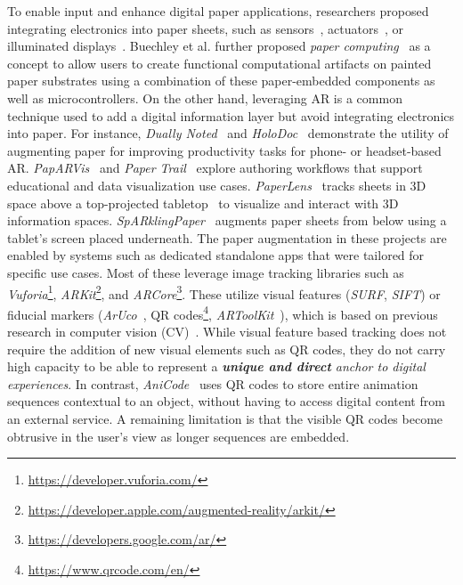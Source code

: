 To enable input and enhance digital paper applications, researchers proposed integrating electronics into paper sheets, such as sensors~\cite{gong_printsense_2014, jacoby_drawing_2013}, actuators~\cite{qi_electronic_2010}, or illuminated displays~\cite{klamka_illuminated_2017, klamka_illumipaper_2017}.
Buechley et al. further proposed \textit{paper computing}~\cite{buechley_paints_2009} as a concept to allow users to create functional computational artifacts on painted paper substrates using a combination of these paper-embedded components as well as microcontrollers.
On the other hand, leveraging AR  is a common technique used to add a digital information layer but avoid integrating electronics into paper.
For instance, \textit{Dually Noted}~\cite{qian_dually_2022} and \textit{HoloDoc}~\cite{li_holodoc_2019} demonstrate the utility of augmenting paper for improving productivity tasks for phone- or headset-based AR.
\textit{PapARVis}~\cite{chen_augmenting_2020} and \textit{Paper Trail}~\cite{rajaram_paper_2022} explore authoring workflows that support educational and data visualization use cases.
\textit{PaperLens}~\cite{spindler_paperlens_2009} tracks sheets in 3D space above a top-projected tabletop~\cite{steimle_physical_2010} to visualize and interact with 3D information spaces.
\textit{SpARklingPaper}~\cite{drey_sparklingpaper_2022} augments paper sheets from below using a tablet’s screen placed underneath.
The paper augmentation in these projects are enabled by systems such as dedicated standalone apps that were tailored for specific use cases. Most of these leverage image tracking libraries such as \textit{Vuforia}\footnote{\url{https://developer.vuforia.com/}}, \textit{ARKit}\footnote{\url{https://developer.apple.com/augmented-reality/arkit/}}, and \textit{ARCore}\footnote{\url{https://developers.google.com/ar/}}. These utilize visual features (\textit{SURF}, \textit{SIFT}) or fiducial markers (\textit{ArUco}~\cite{garrido2014automatic}, QR codes\footnote{\url{https://www.qrcode.com/en/}}, \textit{ARToolKit}~\cite{kato1999marker}),  which is based on previous research in computer vision (CV)~\cite{wagner2010RealTimeDetection, Wagner2008PoseTracking}. While visual feature based tracking does not require the addition of new visual elements such as QR codes, they do not carry high capacity to be able to represent a \textit{\textbf{unique and direct} anchor %
to digital experiences}.
In contrast, \textit{AniCode}~\cite{wang_anicode_2019} uses QR codes to store entire animation sequences contextual to an object, without having to access digital content from an external service.
A remaining limitation is that %
the visible QR codes become obtrusive in the user's view as longer sequences are embedded.






